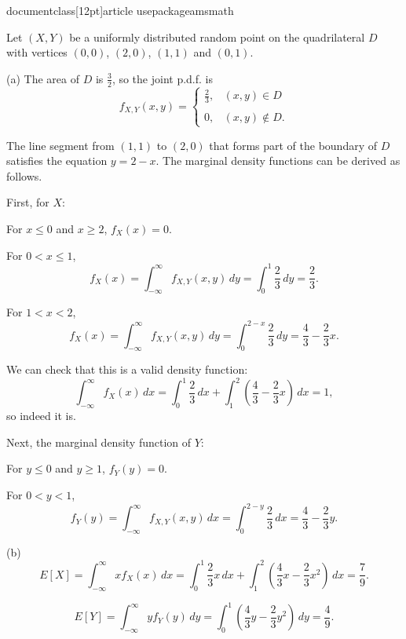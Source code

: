 documentclass[12pt]{article}
usepackage{amsmath}





Let $(X, Y)$ be a uniformly distributed random point on the quadrilateral $D$ with vertices $(0,0)$, $(2, 0)$, $(1, 1)$ and $(0, 1)$.

(a) The area of $D$ is $\frac{3}{2}$, so the joint p.d.f. is
$$f_{X,Y}(x,y) = \begin{cases}
\frac{2}{3}, & (x,y) \in D \\\\
0, & (x,y) \notin D.
\end{cases}$$

The line segment from $(1,1)$ to $(2,0)$ that forms part of the boundary of $D$ satisfies the equation $y=2-x$. The marginal density functions can be derived as follows.

First, for $X$:

For $x \leq 0$ and $x \geq 2$, $f_X(x)=0$.

For $0 < x \leq 1$, 
$$f_X(x) = \int_{-\infty}^{\infty} f_{X,Y}(x,y) \, dy = \int_{0}^{1} \frac{2}{3} \, dy = \frac{2}{3}.$$

For $1 < x < 2$,
$$f_X(x) = \int_{-\infty}^{\infty} f_{X,Y}(x,y) \, dy = \int_{0}^{2-x} \frac{2}{3} \, dy = \frac{4}{3} - \frac{2}{3}x.$$

We can check that this is a valid density function:
$$\int_{-\infty}^{\infty} f_X(x) \, dx = \int_{0}^{1} \frac{2}{3} \, dx + \int_{1}^{2} (\frac{4}{3} - \frac{2}{3}x) \, dx = 1,$$
so indeed it is.

Next, the marginal density function of $Y$:

For $y \leq 0$ and $y \geq 1$, $f_Y(y) = 0$.

For $0 < y < 1$,
$$f_Y(y) = \int_{-\infty}^{\infty} f_{X,Y}(x,y) \, dx = \int_{0}^{2-y} \frac{2}{3} \, dx = \frac{4}{3} - \frac{2}{3}y.$$

(b)
$$E[X] = \int_{-\infty}^{\infty} x f_X(x) \, dx = \int_{0}^{1} \frac{2}{3}x \, dx + \int_{1}^{2} (\frac{4}{3}x - \frac{2}{3}x^2) \, dx = \frac{7}{9}.$$

$$E[Y] = \int_{-\infty}^{\infty} y f_Y(y) \, dy = \int_{0}^{1} (\frac{4}{3}y - \frac{2}{3}y^2) \, dy = \frac{4}{9}.$$


